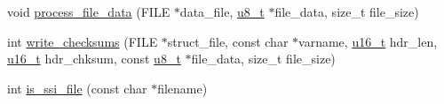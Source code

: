 \begin{DoxyCompactItemize}
\item 
void \hyperlink{openmote-cc2538_2lwip_2src_2apps_2httpd_2makefsdata_2makefsdata_8c_accf3d8691b1a3e2731002b9feea7292c}{process\+\_\+file\+\_\+data} (F\+I\+LE $\ast$data\+\_\+file, \hyperlink{group__compiler__abstraction_ga4caecabca98b43919dd11be1c0d4cd8e}{u8\+\_\+t} $\ast$file\+\_\+data, size\+\_\+t file\+\_\+size)
\item 
int \hyperlink{openmote-cc2538_2lwip_2src_2apps_2httpd_2makefsdata_2makefsdata_8c_a1d75016c940cbfa451c71e0cd896b513}{write\+\_\+checksums} (F\+I\+LE $\ast$struct\+\_\+file, const char $\ast$varname, \hyperlink{group__compiler__abstraction_ga77570ac4fcab86864fa1916e55676da2}{u16\+\_\+t} hdr\+\_\+len, \hyperlink{group__compiler__abstraction_ga77570ac4fcab86864fa1916e55676da2}{u16\+\_\+t} hdr\+\_\+chksum, const \hyperlink{group__compiler__abstraction_ga4caecabca98b43919dd11be1c0d4cd8e}{u8\+\_\+t} $\ast$file\+\_\+data, size\+\_\+t file\+\_\+size)
\item 
int \hyperlink{openmote-cc2538_2lwip_2src_2apps_2httpd_2makefsdata_2makefsdata_8c_ab3b97b4b09364487a17d5513fc13657a}{is\+\_\+ssi\+\_\+file} (const char $\ast$filename)
\end{DoxyCompactItemize}
